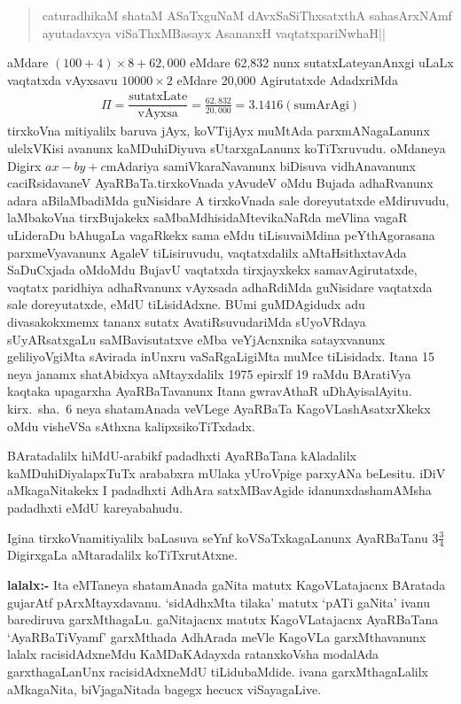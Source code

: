 \begin{verse}
caturadhikaM shataM ASaTxguNaM dAvxSaSiThxsatxthA sahasArxNAmf\\
ayutadavxya viSaThxMBasayx AsananxH vaqtatxpariNwhaH||
\end{verse}
aMdare\; $(100+4) \times 8+62,000$\; eMdare {\rm 62,832} nunx sutatxLateyanAnxgi uLaLx vaqtatxda vAyxsavu\; $10000 \times 2$\; eMdare {\rm 20,000} Agirutatxde AdadxriMda
\begin{align*}
\Pi=\dfrac{\text{sutatxLate}}{\text{vAyxsa}}=\frac{62,832}{20,000}=3.1416 (\text{sumArAgi})
\end{align*}
tirxkoVna mitiyalilx baruva jAyx, koVTijAyx muMtAda parxmANagaLanunx \-ulelxVKisi avanunx kaMDuhiDiyuva sUtarxgaLanunx koTiTxruvudu. oMdaneya Digirx $ax-by+c$\break mAdariya samiVkaraNavanunx biDisuva vidhAnavanunx caciRsidavaneV AyaRBaTa.\break tirxkoVnada yAvudeV oMdu Bujada adhaRvanunx adara aBilaMbadiMda guNisidare A tirxkoVnada sale doreyutatxde eMdiruvudu, laMbakoVna tirxBujakekx saMbaMdhisidaMte\break vikaNaRda  meVlina vagaR uLideraDu bAhugaLa vagaRkekx sama eMdu tiLisuva\break iMdina peYthAgorasana parxmeVyavanunx AgaleV tiLisiruvudu, vaqtatxdalilx aMtaHsithxtavAda SaDuCxjada oMdoMdu BujavU vaqtatxda tirxjayxkekx samavAgirutatxde, vaqtatx paridhiya adhaR\-vanunx vAyxsada adhaRdiMda guNisidare vaqtatxda sale doreyutatxde, eMdU tiLisidAdxne. BUmi guMDAgidudx adu divasakokxmemx tananx sutatx AvatiRsuvudariMda sUyoVR\-daya sUyARsatxgaLu saMBavisutatxve eMba veYjAcnxnika satayxvanunx geliliyoVgiMta sAvirada inUnxru vaSaRgaLigiMta muMce tiLisidadx. Itana {\rm 15} neya janamx shatAbidxya aMtayxdalilx {\rm 1975} epirxlf {\rm 19} raMdu BAratiVya kaqtaka upagarxha AyaRBaTavanunx Itana gwravAthaR uDhAyisalAyitu. kirx.~sha.~{\rm 6} neya shatamAnada veVLege AyaRBaTa KagoVLashAsatxrXkekx oMdu visheVSa sAthxna kalipxsikoTiTxdadx.

BAratadalilx hiMdU-arabikf padadhxti AyaRBaTana kAladalilx kaMDuhiDiyalapxTuTx arababxra mUlaka yUroVpige parxyANa beLesitu. iDiV aMkagaNitakekx I padadhxti AdhAra satxMBavAgide idanunxdashamAMsha padadhxti eMdU kareyabahudu.

Igina tirxkoVnamitiyalilx baLasuva seYnf koVSaTxkagaLanunx AyaRBaTanu $3\frac{3}{4}$ \break DigirxgaLa aMtaradalilx koTiTxrutAtxne.

\textbf{lalalx:-} Ita eMTaneya shatamAnada gaNita matutx KagoVLatajacnx BAratada guja\-rAtf pArxMtayxdavanu. `sidAdhxMta tilaka' matutx `pATi gaNita' ivanu barediruva garxMthagaLu. gaNitajacnx matutx KagoVLatajacnx AyaRBaTana `AyaRBaTiVyamf' garxMthada AdhA\-rada meVle KagoVLa garxMthavanunx lalalx racisidAdxneMdu KaMDaKAdayxda ratanxkoVsha modalAda garxthagaLanUnx racisidAdxneMdU tiLidubaMdide. ivana garxMthagaLalilx aMkagaNita, biVja\-gaNitada bagegx hecucx viSayagaLive.


